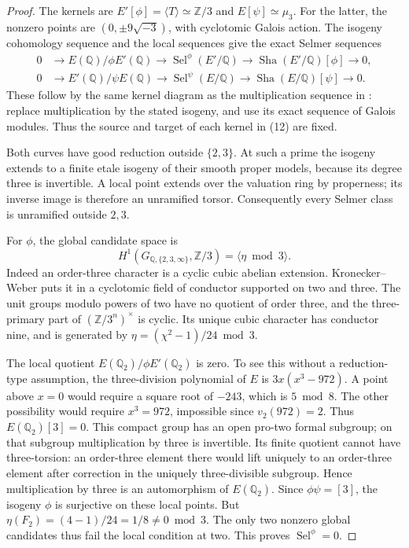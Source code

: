 \begin{proof}
The kernels are \(E'[\phi]=\langle T\rangle\simeq
\mathbb Z/3\) and \(E[\psi]\simeq\mu_3\).
For the latter, the nonzero points are
\((0,\pm9\sqrt{-3})\), with cyclotomic Galois action.
The isogeny cohomology sequence and the local sequences
give the exact Selmer sequences
\[
 \begin{split}
 0&\longrightarrow E(\mathbb Q)/\phi E'(\mathbb Q)
 \longrightarrow\operatorname{Sel}^{\phi}(E'/\mathbb Q)
 \longrightarrow\operatorname{Sha}(E'/\mathbb Q)[\phi]
 \longrightarrow0,\\
 0&\longrightarrow E'(\mathbb Q)/\psi E(\mathbb Q)
 \longrightarrow\operatorname{Sel}^{\psi}(E/\mathbb Q)
 \longrightarrow\operatorname{Sha}(E/\mathbb Q)[\psi]
 \longrightarrow0.
 \end{split}                                             \tag{12}
\]
These follow by the same kernel diagram as the
multiplication sequence in
\cite[IV.2, equations (28)--(29)]{GhostMilneEC}:
replace multiplication by the stated isogeny, and
use its exact sequence of Galois modules. Thus the
source and target of each kernel in (12) are fixed.

Both curves have good reduction outside \(\{2,3\}\).
At such a prime the isogeny extends to a finite etale
isogeny of their smooth proper models, because its
degree three is invertible. A local point extends
over the valuation ring by properness; its inverse
image is therefore an unramified torsor. Consequently
every Selmer class is unramified outside \(2,3\).

For \(\phi\), the global candidate space is
\[
 H^1(G_{\mathbb Q,\{2,3,\infty\}},\mathbb Z/3)
                  =\langle\eta\bmod3\rangle.
\]
Indeed an order-three character is a cyclic cubic
abelian extension. Kronecker--Weber
\cite[I.4.16]{GhostMilneCFT} puts it in a cyclotomic
field of conductor supported on two and three.
The unit groups modulo powers of two have no
quotient of order three, and the three-primary
part of \((\mathbb Z/3^n)^\times\) is cyclic.
Its unique cubic character has conductor nine,
and is generated by \(\eta=(\chi^2-1)/24\bmod3\).

The local quotient
\(E(\mathbb Q_2)/\phi E'(\mathbb Q_2)\) is zero.
To see this without a reduction-type assumption,
the three-division polynomial of \(E\) is
\(3x(x^3-972)\). A point above \(x=0\) would
require a square root of \(-243\), which is
\(5\bmod8\). The other possibility would require
\(x^3=972\), impossible since \(v_2(972)=2\).
Thus \(E(\mathbb Q_2)[3]=0\).
This compact group has an open pro-two formal subgroup;
on that subgroup multiplication by three is invertible.
Its finite quotient cannot have three-torsion: an
order-three element there would lift uniquely to
an order-three element after correction in the
uniquely three-divisible subgroup. Hence multiplication
by three is an automorphism of \(E(\mathbb Q_2)\).
Since \(\phi\psi=[3]\), the isogeny \(\phi\)
is surjective on these local points. But
\(\eta(F_2)=(4-1)/24=1/8\ne0\bmod3\).
The only two nonzero global candidates thus fail
the local condition at two. This proves
\(\operatorname{Sel}^{\phi}=0\).


\end{proof}
